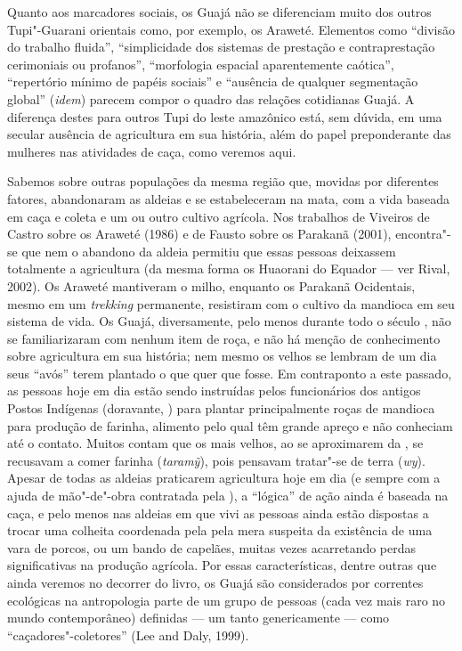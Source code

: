 Quanto aos marcadores sociais, os Guajá não se diferenciam muito dos
outros Tupi"-Guarani orientais como, por exemplo, os Araweté. Elementos
como ``divisão do trabalho fluida'', ``simplicidade dos sistemas de
prestação e contraprestação cerimoniais ou profanos'', ``morfologia
espacial aparentemente caótica'', ``repertório mínimo de papéis
sociais'' e ``ausência de qualquer segmentação global'' (\emph{idem}) parecem
compor o quadro das relações cotidianas Guajá. A diferença destes para
outros Tupi do leste amazônico está, sem dúvida, em uma secular ausência
de agricultura em sua história, além do papel preponderante das mulheres
nas atividades de caça, como veremos aqui.

Sabemos sobre outras populações da mesma região que, movidas por
diferentes fatores, abandonaram as aldeias e se estabeleceram na mata,
com a vida baseada em caça e coleta e um ou outro cultivo agrícola. Nos
trabalhos de Viveiros de Castro sobre os Araweté (1986) e de Fausto
sobre os Parakanã (2001), encontra"-se que nem o abandono da aldeia
permitiu que essas pessoas deixassem totalmente a agricultura (da mesma
forma os Huaorani do Equador --- ver Rival, 2002). Os Araweté mantiveram o
milho, enquanto os Parakanã Ocidentais, mesmo em um \emph{trekking}
permanente, resistiram com o cultivo da mandioca em seu sistema de vida.
Os Guajá, diversamente, pelo menos durante todo o século , não se
familiarizaram com nenhum item de roça, e não há menção de conhecimento
sobre agricultura em sua história; nem mesmo os velhos se lembram de um
dia seus ``avós'' terem plantado o que quer que fosse. Em contraponto a
este passado, as pessoas hoje em dia estão sendo instruídas pelos
funcionários dos antigos Postos Indígenas (doravante, ) para plantar
principalmente roças de mandioca para produção de farinha, alimento pelo
qual têm grande apreço e não conheciam até o contato. Muitos contam que
os mais velhos, ao se aproximarem da , se recusavam a comer farinha
(\emph{taramỹ}), pois pensavam tratar"-se de terra (\emph{wy}). Apesar de
todas as aldeias praticarem agricultura hoje em dia (e sempre com a
ajuda de mão"-de"-obra contratada pela ), a ``lógica'' de ação ainda é
baseada na caça, e pelo menos nas aldeias em que vivi as pessoas ainda
estão dispostas a trocar uma colheita coordenada pela  pela mera
suspeita da existência de uma vara de porcos, ou um bando de capelães,
muitas vezes acarretando perdas significativas na produção agrícola. Por
essas características, dentre outras que ainda veremos no decorrer do
livro, os Guajá são considerados por correntes ecológicas na
antropologia parte de um grupo de pessoas (cada vez mais raro no mundo
contemporâneo) definidas --- um tanto genericamente --- como
``caçadores"-coletores'' (Lee and Daly, 1999).

